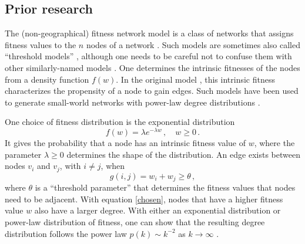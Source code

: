 \documentclass[%
 reprint,
 amsmath,amssymb,
 aps,
]{revtex4-1}
\begin{document}
\subsection{Prior research}

The (non-geographical) fitness network model is a class of networks that assigns fitness values to the $n$ nodes of a network \cite{yusuke}. Such models are sometimes also called ``threshold models'' \cite{geographical_threshold}, although one needs to be careful not to confuse them with other similarly-named models \cite{newman2018}. One determines the intrinsic fitnesses of the nodes from a density function $f(w)$. In the original model \cite{caldarelli}, this intrinsic fitness characterizes the propensity of a node to gain edges. Such models have been used to generate small-world networks with power-law degree distributions \cite{geographical_threshold}.

One choice of fitness distribution is the exponential distribution
\begin{equation}\label{exponentialfitness}
    f(w) = \lambda e^{-\lambda w}\,, \quad w \geq 0\,.
\end{equation}
It gives the probability that a node has an intrinsic fitness value of $w$, where the parameter $\lambda \geq 0$ determines the shape of the distribution. An edge exists between nodes $v_i$ and $v_j$, with $i \neq j$, when 
\begin{equation} \label{chosen}
    g(i,j) = w_i + w_j \geq \theta \,,
\end{equation}
where $\theta$ is a ``threshold parameter'' that determines the fitness values that nodes need to be adjacent. With equation \eqref{chosen}, nodes that have a higher fitness value $w$ also have a larger degree. With either an exponential distribution or power-law distribution of fitness, one can show that the resulting degree distribution follows the power law $p(k) \sim k^{-2}$ as $k \rightarrow \infty$ \cite{caldarelli, threshold}.
\end{document}
